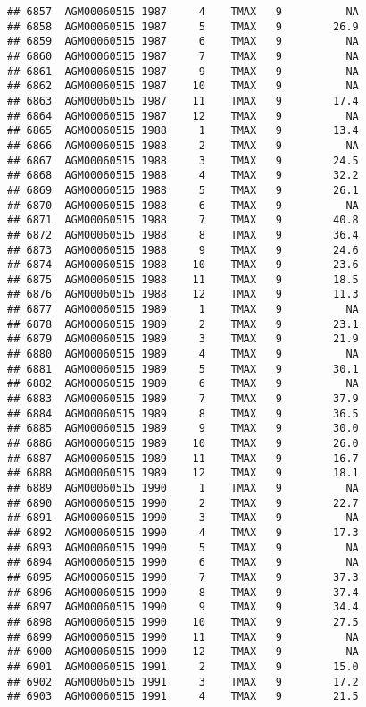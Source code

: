 \documentclass{article}\usepackage[]{graphicx}\usepackage[]{color}
\makeatletter
\newenvironment{kframe}{%
 \def\at@end@of@kframe{}%
 \ifinner\ifhmode%
  \def\at@end@of@kframe{\end{minipage}}%
  \begin{minipage}{\columnwidth}%
 \fi\fi%
 \def\FrameCommand##1{\hskip\@totalleftmargin \hskip-\fboxsep
 \colorbox{shadecolor}{##1}\hskip-\fboxsep
     \hskip-\linewidth \hskip-\@totalleftmargin \hskip\columnwidth}%
 \MakeFramed {\advance\hsize-\width
   \@totalleftmargin\z@ \linewidth\hsize
   \@setminipage}}%
 {\par\unskip\endMakeFramed%
 \at@end@of@kframe}
\newenvironment{knitrout}{}{} %
\makeatother
\begin{document}
\begin{knitrout}
\begin{kframe}
\begin{verbatim}
## 6857  AGM00060515 1987     4    TMAX   9          NA
## 6858  AGM00060515 1987     5    TMAX   9        26.9
## 6859  AGM00060515 1987     6    TMAX   9          NA
## 6860  AGM00060515 1987     7    TMAX   9          NA
## 6861  AGM00060515 1987     9    TMAX   9          NA
## 6862  AGM00060515 1987    10    TMAX   9          NA
## 6863  AGM00060515 1987    11    TMAX   9        17.4
## 6864  AGM00060515 1987    12    TMAX   9          NA
## 6865  AGM00060515 1988     1    TMAX   9        13.4
## 6866  AGM00060515 1988     2    TMAX   9          NA
## 6867  AGM00060515 1988     3    TMAX   9        24.5
## 6868  AGM00060515 1988     4    TMAX   9        32.2
## 6869  AGM00060515 1988     5    TMAX   9        26.1
## 6870  AGM00060515 1988     6    TMAX   9          NA
## 6871  AGM00060515 1988     7    TMAX   9        40.8
## 6872  AGM00060515 1988     8    TMAX   9        36.4
## 6873  AGM00060515 1988     9    TMAX   9        24.6
## 6874  AGM00060515 1988    10    TMAX   9        23.6
## 6875  AGM00060515 1988    11    TMAX   9        18.5
## 6876  AGM00060515 1988    12    TMAX   9        11.3
## 6877  AGM00060515 1989     1    TMAX   9          NA
## 6878  AGM00060515 1989     2    TMAX   9        23.1
## 6879  AGM00060515 1989     3    TMAX   9        21.9
## 6880  AGM00060515 1989     4    TMAX   9          NA
## 6881  AGM00060515 1989     5    TMAX   9        30.1
## 6882  AGM00060515 1989     6    TMAX   9          NA
## 6883  AGM00060515 1989     7    TMAX   9        37.9
## 6884  AGM00060515 1989     8    TMAX   9        36.5
## 6885  AGM00060515 1989     9    TMAX   9        30.0
## 6886  AGM00060515 1989    10    TMAX   9        26.0
## 6887  AGM00060515 1989    11    TMAX   9        16.7
## 6888  AGM00060515 1989    12    TMAX   9        18.1
## 6889  AGM00060515 1990     1    TMAX   9          NA
## 6890  AGM00060515 1990     2    TMAX   9        22.7
## 6891  AGM00060515 1990     3    TMAX   9          NA
## 6892  AGM00060515 1990     4    TMAX   9        17.3
## 6893  AGM00060515 1990     5    TMAX   9          NA
## 6894  AGM00060515 1990     6    TMAX   9          NA
## 6895  AGM00060515 1990     7    TMAX   9        37.3
## 6896  AGM00060515 1990     8    TMAX   9        37.4
## 6897  AGM00060515 1990     9    TMAX   9        34.4
## 6898  AGM00060515 1990    10    TMAX   9        27.5
## 6899  AGM00060515 1990    11    TMAX   9          NA
## 6900  AGM00060515 1990    12    TMAX   9          NA
## 6901  AGM00060515 1991     2    TMAX   9        15.0
## 6902  AGM00060515 1991     3    TMAX   9        17.2
## 6903  AGM00060515 1991     4    TMAX   9        21.5

\end{verbatim}
\end{kframe}
\end{knitrout}
\end{document}
